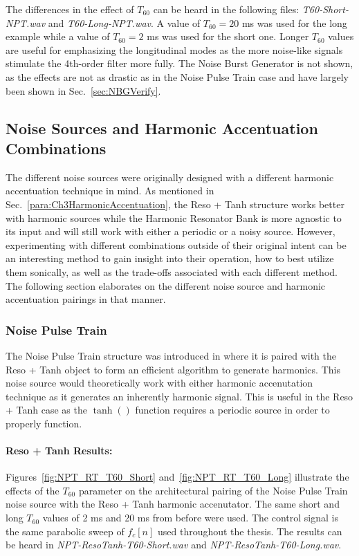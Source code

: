 \documentclass[../main.tex]{subfiles}
\begin{document}
The differences in the effect of $T_{60}$ can be heard in the following files: \emph{T60-Short-NPT.wav} and \emph{T60-Long-NPT.wav}. A value of $T_{60} = 20$ ms was used for the long example while a value of $T_{60} = 2$ ms was used for the short one. Longer $T_{60}$ values are useful for emphasizing the longitudinal modes as the more noise-like signals stimulate the 4th-order filter more fully. The Noise Burst Generator is not shown, as the effects are not as drastic as in the Noise Pulse Train case and have largely been shown in Sec.~\ref{sec:NBGVerify}.

\subsection{Noise Sources and Harmonic Accentuation Combinations}
\label{subsec:NS_and_HA_Combos}
The different noise sources were originally designed with a different harmonic accentuation technique in mind. As mentioned in Sec.~\ref{para:Ch3HarmonicAccentuation}, the Reso + Tanh structure works better with harmonic sources while the Harmonic Resonator Bank is more agnostic to its input and will still work with either a periodic or a noisy source. However, experimenting with different combinations outside of their original intent can be an interesting method to gain insight into their operation, how to best utilize them sonically, as well as the trade-offs associated with each different method. The following section elaborates on the different noise source and harmonic accentuation pairings in that manner.

\subsubsection{Noise Pulse Train}
The Noise Pulse Train structure was introduced in  where it is paired with the Reso + Tanh object to form an efficient algorithm to generate harmonics. This noise source would theoretically work with either harmonic accenutation technique as it generates an inherently harmonic signal. This is useful in the Reso + Tanh case as the $\tanh()$ function requires a periodic source in order to properly function.

\paragraph{Reso + Tanh Results:}
Figures~\ref{fig:NPT_RT_T60_Short} and~\ref{fig:NPT_RT_T60_Long} illustrate the effects of the $T_{60}$ parameter on the architectural pairing of the Noise Pulse Train noise source with the Reso + Tanh harmonic accenutator. The same short and long $T_{60}$ values of 2 ms and 20 ms from before were used. The control signal is the same parabolic sweep of $f_c[n]$ used throughout the thesis. The results can be heard in \emph{NPT-ResoTanh-T60-Short.wav} and \emph{NPT-ResoTanh-T60-Long.wav}.
\end{document}
